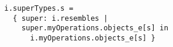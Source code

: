\lstset{frame=tb, aboveskip=12pt, belowskip=-3pt, breaklines=true, basicstyle=\small\ttfamily, tabsize=2, mathescape=true}
\begin{lstlisting}[caption={facts.als, lines 158-161}, label=alloy:INTERFACE_SUBTYPE, captionpos=b]
i.superTypes.s =
  { super: i.resembles |
    super.myOperations.objects_e[s] in
      i.myOperations.objects_e[s] }
\end{lstlisting}